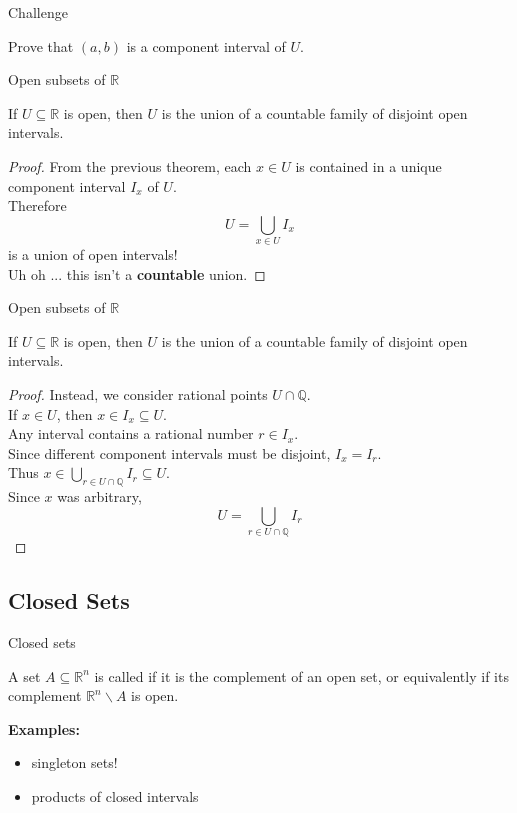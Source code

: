 \documentclass{beamer}
\begin{document}
\begin{frame}{Challenge}
\begin{prob}
Prove that $(a,b)$ is a component interval of $U$.
\end{prob}
\end{frame}

\begin{frame}{Open subsets of $\mathbb{R}$}
\begin{thm}
If $U\subseteq\mathbb{R}$ is open, then $U$ is the union of a countable family of disjoint open intervals.
\end{thm}
\pause
\begin{proof}
From the previous theorem, each $x\in U$ is contained in a unique component interval $I_x$ of $U$.\\
\pause
Therefore
$$U = \bigcup_{x\in U} I_x$$
is a union of open intervals!\\
\pause
{\color{red}Uh oh ... this isn't a \textbf{countable} union.}
\end{proof}
\end{frame}

\begin{frame}{Open subsets of $\mathbb{R}$}
\begin{thm}
If $U\subseteq\mathbb{R}$ is open, then $U$ is the union of a countable family of disjoint open intervals.
\end{thm}
\begin{proof}
Instead, we consider rational points $U\cap\mathbb{Q}$.\\
\pause
If $x\in U$, then $x\in I_x\subseteq U$.\\
\pause
Any interval contains a rational number $r\in I_x$.\\
\pause
Since different component intervals must be disjoint, $I_x=I_r$.\\
\pause
Thus $x\in \bigcup_{r\in U\cap\mathbb{Q}} I_r\subseteq U$.\\
\pause
Since $x$ was arbitrary, 
$$U= \bigcup_{r\in U\cap\mathbb{Q}} I_r$$
\end{proof}
\end{frame}

\subsection{Closed Sets}

\begin{frame}{Closed sets}
\begin{defn}
A set $A\subseteq\mathbb{R}^n$ is called  if it is the complement of an open set, or equivalently if its complement $\mathbb{R}^n\backslash A$ is open.
\end{defn}
\pause
\textbf{Examples:}
\begin{itemize}
\pause
\item singleton sets!
\pause
\item products of closed intervals
\end{itemize}
\end{frame}
\end{document}
